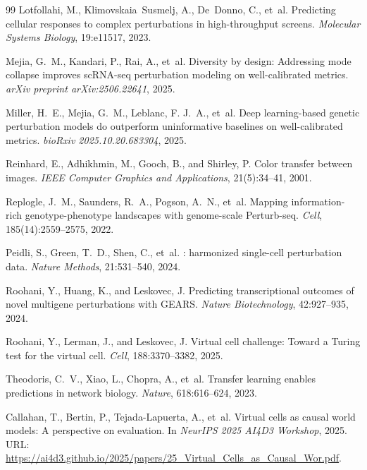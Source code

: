 \documentclass{article}
\theoremstyle{plain}
\theoremstyle{definition}
\theoremstyle{remark}
\begin{document}
\begin{thebibliography}{99}
Lotfollahi, M., Klimovskaia~Susmelj, A., De~Donno, C., et~al.
\newblock Predicting cellular responses to complex perturbations in high-throughput screens.
\newblock \emph{Molecular Systems Biology}, 19:e11517, 2023.

Mejia, G.~M., Kandari, P., Rai, A., et~al.
\newblock Diversity by design: Addressing mode collapse improves {scRNA-seq} perturbation modeling on well-calibrated metrics.
\newblock \emph{arXiv preprint arXiv:2506.22641}, 2025.

Miller, H.~E., Mejia, G.~M., Leblanc, F. J.~A., et~al.
\newblock Deep learning-based genetic perturbation models do outperform uninformative baselines on well-calibrated metrics.
\newblock \emph{bioRxiv 2025.10.20.683304}, 2025.

Reinhard, E., Adhikhmin, M., Gooch, B., and Shirley, P.
\newblock Color transfer between images.
\newblock \emph{IEEE Computer Graphics and Applications}, 21(5):34--41, 2001.

Replogle, J.~M., Saunders, R.~A., Pogson, A.~N., et~al.
\newblock Mapping information-rich genotype-phenotype landscapes with genome-scale {Perturb-seq}.
\newblock \emph{Cell}, 185(14):2559--2575, 2022.

Peidli, S., Green, T.~D., Shen, C., et~al.
: harmonized single-cell perturbation data.
\newblock \emph{Nature Methods}, 21:531--540, 2024.

Roohani, Y., Huang, K., and Leskovec, J.
\newblock Predicting transcriptional outcomes of novel multigene perturbations with {GEARS}.
\newblock \emph{Nature Biotechnology}, 42:927--935, 2024.

Roohani, Y., Lerman, J., and Leskovec, J.
\newblock Virtual cell challenge: Toward a {Turing} test for the virtual cell.
\newblock \emph{Cell}, 188:3370--3382, 2025.

Theodoris, C.~V., Xiao, L., Chopra, A., et~al.
\newblock Transfer learning enables predictions in network biology.
\newblock \emph{Nature}, 618:616--624, 2023.

Callahan, T., Bertin, P., Tejada-Lapuerta, A., et~al.
\newblock Virtual cells as causal world models: A perspective on evaluation.
\newblock In \emph{NeurIPS 2025 AI4D3 Workshop}, 2025.
\newblock URL: \url{https://ai4d3.github.io/2025/papers/25_Virtual_Cells_as_Causal_Wor.pdf}.


\end{thebibliography}
\end{document}
